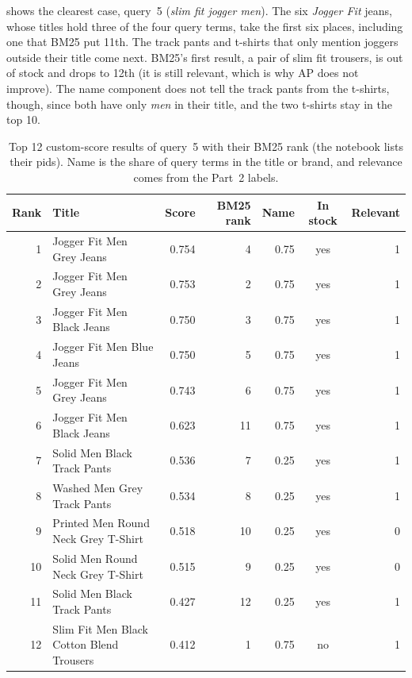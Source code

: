 \documentclass[11pt,a4paper]{article}
\begin{document}
 shows the clearest case, query~5 (\emph{slim fit jogger
men}). The six \emph{Jogger Fit} jeans, whose titles hold three of the four
query terms, take the first six places, including one that BM25 put 11th. The
track pants and t-shirts that only mention joggers outside their title come next.
BM25's first result, a pair of slim fit trousers, is out of stock and drops to
12th (it is still relevant, which is why AP does not improve). The name
component does not tell the track pants from the t-shirts, though, since both
have only \emph{men} in their title, and the two t-shirts stay in the top 10.

\begin{table}[htbp]
  \centering
  \small
  \setlength{\tabcolsep}{4pt}
  \caption{Top 12 custom-score results of query~5 with their BM25 rank (the
  notebook lists their pids). Name is the share of query terms in the title
  or brand, and relevance comes from the Part~2 labels.}
  \label{tab:custom-q5}
  \begin{tabular}{rlrrrcr}
    \toprule
    Rank & Title & Score & BM25 rank & Name & In stock & Relevant \\
    \midrule
    1 & Jogger Fit Men Grey Jeans & 0.754 & 4 & 0.75 & yes & 1 \\
    2 & Jogger Fit Men Grey Jeans & 0.753 & 2 & 0.75 & yes & 1 \\
    3 & Jogger Fit Men Black Jeans & 0.750 & 3 & 0.75 & yes & 1 \\
    4 & Jogger Fit Men Blue Jeans & 0.750 & 5 & 0.75 & yes & 1 \\
    5 & Jogger Fit Men Grey Jeans & 0.743 & 6 & 0.75 & yes & 1 \\
    6 & Jogger Fit Men Black Jeans & 0.623 & 11 & 0.75 & yes & 1 \\
    7 & Solid Men Black Track Pants & 0.536 & 7 & 0.25 & yes & 1 \\
    8 & Washed Men Grey Track Pants & 0.534 & 8 & 0.25 & yes & 1 \\
    9 & Printed Men Round Neck Grey T-Shirt & 0.518 & 10 & 0.25 & yes & 0 \\
    10 & Solid Men Round Neck Grey T-Shirt & 0.515 & 9 & 0.25 & yes & 0 \\
    11 & Solid Men Black Track Pants & 0.427 & 12 & 0.25 & yes & 1 \\
    12 & Slim Fit Men Black Cotton Blend Trousers & 0.412 & 1 & 0.75 & no & 1 \\
    \bottomrule
  \end{tabular}
\end{table}
\end{document}

